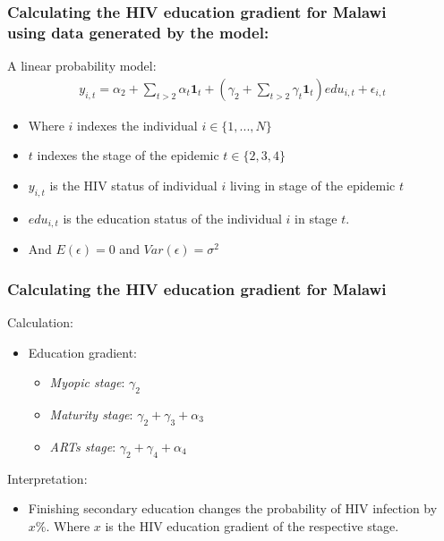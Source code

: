 \documentclass{beamer}
\begin{document}
\begin{frame}
\frametitle{Calculating the HIV education gradient for Malawi\\using data generated by the model:}
A linear probability model:
\begin{align*}
y_{i,t}=\alpha_{2}+\sum_{t>2}\alpha_{t}\mathbf{1}_{t}+(\gamma_{2}+\sum_{t>2}\gamma_{t}\mathbf{1}_{t})edu_{i,t}+\epsilon_{i,t}
\end{align*}
\begin{itemize}
\item Where $i$ indexes the individual $i\in \{1,...,N\}$ 
\item $t$ indexes the stage of the epidemic $t\in \{2,3,4\}$
\item $y_{i,t}$ is the HIV status of individual $i$ living in stage of the epidemic $t$
\item $edu_{i,t}$ is the education status of the individual $i$ in stage $t$. 
\item And $E(\epsilon)=0$ and $Var(\epsilon)=\sigma^{2}$
\end{itemize}
\end{frame}

\begin{frame}
\frametitle{Calculating the HIV education gradient for Malawi}
\begin{Large}
Calculation:
\begin{itemize}
\item Education gradient:
\begin{itemize}
\item \textit{Myopic stage}: $\gamma_{2}$
\item  \textit{Maturity stage}: $\gamma_{2}+\gamma_{3}+\alpha_{3}$
\item  \textit{ARTs stage}: $\gamma_{2}+\gamma_{4}+\alpha_{4}$
\end{itemize}
\end{itemize}
Interpretation:
\begin{itemize}
\item  Finishing secondary education changes the probability of HIV infection by $x \%$. Where $x$ is the HIV education gradient of the respective stage.

\end{itemize}
\end{Large}
\end{frame}
\end{document}
